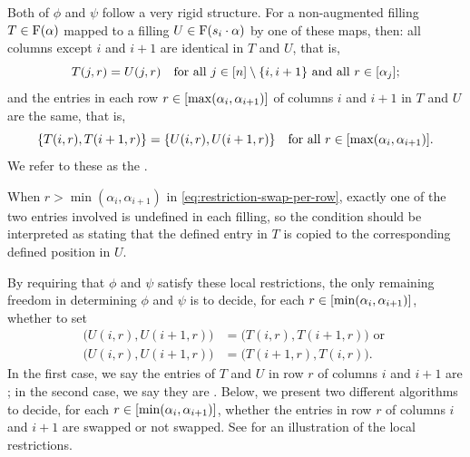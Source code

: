 Both of \(\phi\) and \(\psi\) follow a very rigid structure.
For a non-augmented filling \(T \in \Fill(\alpha)\) mapped
to a filling \(U \in \Fill(s_i \permact \alpha)\) by one of these maps, then:
all columns except \(i\) and \(i+1\) are identical in \(T\) and \(U\), that is,
\begin{equation} \label{eq:restriction-other-columns}
    T(j, r) = U(j, r)
    \quad\text{for all } j \in [n] \setminus \{i, i+1\}
    \text{ and all } r \in [\alpha_j];
\end{equation}
and the entries in each row \(r \in [\max(\alpha_i, \alpha_{i+1})]\) of columns \(i\) and \(i+1\) in \(T\) and \(U\) are the same, that is,
\begin{equation} \label{eq:restriction-swap-per-row}
    \{ T(i, r), T(i+1, r) \}
    =
    \{ U(i, r), U(i+1, r) \}
    \quad\text{for all } r \in [\max(\alpha_i, \alpha_{i+1})].
\end{equation}
We refer to these as the .

When \(r > \min(\alpha_i, \alpha_{i+1})\) in \eqref{eq:restriction-swap-per-row}, exactly one of the two entries involved is undefined in each filling, so the condition should be interpreted as stating that the defined entry in \(T\) is copied to the corresponding defined position in \(U\).

By requiring that \(\phi\) and \(\psi\) satisfy these local restrictions, the only remaining freedom in determining \(\phi\) and \(\psi\) is to decide, for each \(r \in [\min(\alpha_i, \alpha_{i+1})]\), whether to set
\begin{equation*}
    \begin{aligned}
        \big(U(i,r), U(i+1,r)\big) &= \big(T(i,r), T(i+1,r)\big) \text{ or }\\
        \big(U(i,r), U(i+1,r)\big) &= \big(T(i+1,r), T(i,r)\big).
    \end{aligned}
\end{equation*}
In the first case, we say the entries of \(T\) and \(U\) in row \(r\) of columns \(i\) and \(i+1\) are ;
in the second case, we say they are .
Below, we present two different algorithms to decide, for each \(r \in [\min(\alpha_i, \alpha_{i+1})]\), whether the entries in row \(r\) of columns \(i\) and \(i+1\) are swapped or not swapped.
See  for an illustration of the local restrictions.

